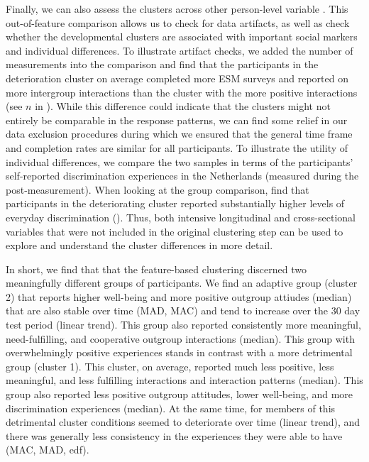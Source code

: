 Finally, we can also assess the clusters across other person-level
variable \citep[e.g.,][]{monden2022}. This out-of-feature comparison
allows us to check for data artifacts, as well as check whether the
developmental clusters are associated with important social markers and
individual differences. To illustrate artifact checks, we added the
number of measurements into the comparison and find that the
participants in the deterioration cluster on average completed more ESM
surveys and reported on more intergroup interactions than the cluster
with the more positive interactions (see \(n\) in
). While this difference could indicate
that the clusters might not entirely be comparable in the response
patterns, we can find some relief in our data exclusion procedures
during which we ensured that the general time frame and completion rates
are similar for all participants. To illustrate the utility of
individual differences, we compare the two samples in terms of the
participants' self-reported discrimination experiences in the
Netherlands (measured during the post-measurement). When looking at the
group comparison, find that participants in the deteriorating cluster
reported substantially higher levels of everyday discrimination
(). Thus, both intensive longitudinal and
cross-sectional variables that were not included in the original
clustering step can be used to explore and understand the cluster
differences in more detail.

In short, we find that that the feature-based clustering discerned two
meaningfully different groups of participants. We find an adaptive group
(cluster 2) that reports higher well-being and more positive outgroup
attiudes (median) that are also stable over time (MAD, MAC) and tend to
increase over the 30 day test period (linear trend). This group also
reported consistently more meaningful, need-fulfilling, and cooperative
outgroup interactions (median). This group with overwhelmingly positive
experiences stands in contrast with a more detrimental group (cluster
1). This cluster, on average, reported much less positive, less
meaningful, and less fulfilling interactions and interaction patterns
(median). This group also reported less positive outgroup attitudes,
lower well-being, and more discrimination experiences (median). At the
same time, for members of this detrimental cluster conditions seemed to
deteriorate over time (linear trend), and there was generally less
consistency in the experiences they were able to have (MAC, MAD, edf).

